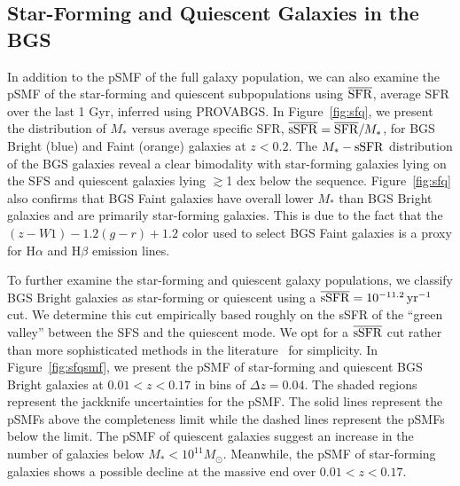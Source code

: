 \subsection{Star-Forming and Quiescent Galaxies in the BGS} \label{sec:sfq}
In addition to the pSMF of the full galaxy population, we can also examine the
pSMF of the star-forming and quiescent subpopulations using 
$\overline{\rm SFR}$, average SFR over the last 1 Gyr, inferred using PROVABGS. 
In Figure~\ref{fig:sfq}, we present the distribution of $M_*$ versus average
specific SFR, $\overline{\rm sSFR} = \overline{\rm SFR}/M_*$, for BGS Bright
(blue) and Faint (orange) galaxies at $z < 0.2$. 
The $M_*-{\rm sSFR}$ distribution of the BGS galaxies reveal a clear
bimodality with star-forming galaxies lying on the SFS and quiescent galaxies
lying $\gtrsim$1 dex below the sequence. 
Figure~\ref{fig:sfq} also confirms that BGS Faint galaxies have overall lower
$M_*$ than BGS Bright galaxies and are primarily star-forming galaxies. 
This is due to the fact that the $(z - W1)-1.2(g-r)+1.2$ color used to select
BGS Faint galaxies is a proxy for H$\alpha$ and H$\beta$ emission lines.  

To further examine the star-forming and quiescent galaxy populations, we
classify BGS Bright galaxies as star-forming or quiescent using a 
$\overline{\rm sSFR} = 10^{-11.2}\,{\rm yr}^{-1}$ cut. 
We determine this cut empirically based roughly on the sSFR of the ``green
valley'' between the SFS and the quiescent mode. 
We opt for a $\overline{\rm sSFR}$ cut rather than more sophisticated methods
in the literature~\citep[\emph{e.g.}][]{hahn2019, donnari2019} for simplicity. 
In Figure~\ref{fig:sfqsmf}, we present the pSMF of star-forming and quiescent
BGS Bright galaxies at $0.01 < z < 0.17$ in bins of $\Delta z = 0.04$.
The shaded regions represent the jackknife uncertainties for the pSMF. 
The solid lines represent the pSMFs above the completeness limit while the
dashed lines represent the pSMFs below the limit. 
The pSMF of quiescent galaxies suggest an increase in the number of galaxies
below $M_* < 10^{11}M_\odot$.
Meanwhile, the pSMF of star-forming galaxies shows a possible decline at the
massive end over $0.01 < z < 0.17$. 

